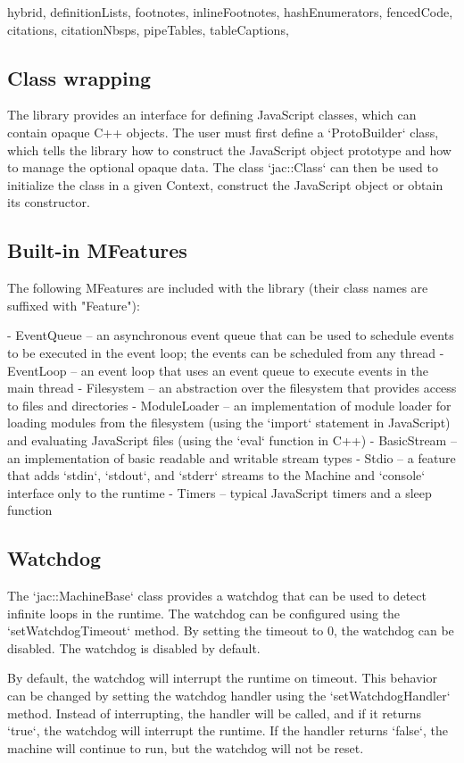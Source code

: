 \begin{markdown*}{%
  hybrid,
  definitionLists,
  footnotes,
  inlineFootnotes,
  hashEnumerators,
  fencedCode,
  citations,
  citationNbsps,
  pipeTables,
  tableCaptions,
}
\subsection{Class wrapping}

The library provides an interface for defining JavaScript classes, which can contain opaque C++ objects. The user must first define a `ProtoBuilder` class, which tells the library how to construct the JavaScript object prototype and how to manage the optional opaque data. The class `jac::Class` can then be used to initialize the class in a given Context, construct the JavaScript object or obtain its constructor.

\subsection{Built-in MFeatures}

The following MFeatures are included with the library (their class names are suffixed with "Feature"):

  - EventQueue -- an asynchronous event queue that can be used to schedule events to be executed in the event loop; the events can be scheduled from any thread
  - EventLoop -- an event loop that uses an event queue to execute events in the main thread
  - Filesystem -- an abstraction over the filesystem that provides access to files and directories
  - ModuleLoader -- an implementation of module loader for loading modules from the filesystem (using the `import` statement in JavaScript) and evaluating JavaScript files (using the `eval` function in C++)
  - BasicStream -- an implementation of basic readable and writable stream types
  - Stdio -- a feature that adds `stdin`, `stdout`, and `stderr` streams to the Machine and `console` interface only to the runtime
  - Timers -- typical JavaScript timers and a sleep function

\subsection{Watchdog}

The `jac::MachineBase` class provides a watchdog that can be used to detect infinite loops in the runtime. The watchdog can be configured using the `setWatchdogTimeout` method. By setting the timeout to 0, the watchdog can be disabled. The watchdog is disabled by default.

By default, the watchdog will interrupt the runtime on timeout. This behavior can be changed by setting the watchdog handler using the `setWatchdogHandler` method. Instead of interrupting, the handler will be called, and if it returns `true`, the watchdog will interrupt the runtime. If the handler returns `false`, the machine will continue to run, but the watchdog will not be reset.



\end{markdown*}
